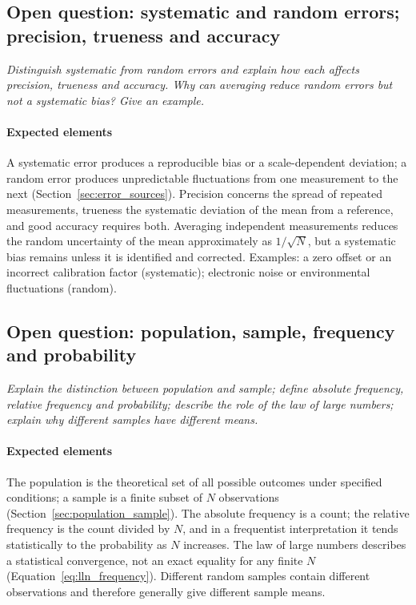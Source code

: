 \subsection{Open question: systematic and random errors; precision, trueness and accuracy}

\emph{Distinguish systematic from random errors and explain how each affects precision, trueness and accuracy. Why can averaging reduce random errors but not a systematic bias? Give an example.}

\paragraph{Expected elements} A systematic error produces a reproducible bias or a scale-dependent deviation; a random error produces unpredictable fluctuations from one measurement to the next (Section~\ref{sec:error_sources}). Precision concerns the spread of repeated measurements, trueness the systematic deviation of the mean from a reference, and good accuracy requires both. Averaging independent measurements reduces the random uncertainty of the mean approximately as $1/\sqrt{N}$, but a systematic bias remains unless it is identified and corrected. Examples: a zero offset or an incorrect calibration factor (systematic); electronic noise or environmental fluctuations (random).

\subsection{Open question: population, sample, frequency and probability}

\emph{Explain the distinction between population and sample; define absolute frequency, relative frequency and probability; describe the role of the law of large numbers; explain why different samples have different means.}

\paragraph{Expected elements} The population is the theoretical set of all possible outcomes under specified conditions; a sample is a finite subset of $N$ observations (Section~\ref{sec:population_sample}). The absolute frequency is a count; the relative frequency is the count divided by $N$, and in a frequentist interpretation it tends statistically to the probability as $N$ increases. The law of large numbers describes a statistical convergence, not an exact equality for any finite $N$ (Equation~\eqref{eq:lln_frequency}). Different random samples contain different observations and therefore generally give different sample means.

